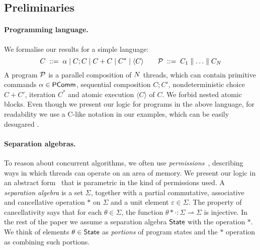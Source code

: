 %

\subsection{Preliminaries\label{sec:setting}}

\paragraph{Programming language.}
We formalise our results for a simple %
language:
$$
C  \;::=\;  \alpha
 \mid C;C
 \mid C+C 
 \mid C^* \mid \langle C \rangle
\qquad
\mathcal{P} \;::=\; C_1 \parallel \ldots \parallel C_N
$$ 
A program $\mathcal{P}$ is a parallel composition of $N$ threads, which can
contain primitive commands $\alpha \in {\sf PComm}$, %
sequential composition $C;C'$, nondeterministic choice $C+C'$, iteration
$C^*$ and atomic execution $\langle C \rangle$ of $C$.
We forbid nested atomic blocks. Even though we present our logic for programs in
the above language, for readability we use a C-like notation in our examples,
which can be easily desugared \tra{\ref{app:formal}}{\nformal}.

\paragraph{Separation algebras.} To reason about concurrent algorithms, we often use
{\em permissions}~\cite{boyland},
describing ways in which threads can operate on an area of memory.  We present
our logic in an abstract form~\cite{asl} that is parametric in the kind of
permissions used.
A {\em separation algebra} is a set $\Sigma$, together with a partial
commutative, associative and cancellative operation $*$ on $\Sigma$ and a unit element
$\varepsilon \in \Sigma$. 
The property of cancellativity says that for each $\theta \in \Sigma$, the
function $\theta * \cdot : \Sigma \rightharpoonup \Sigma$ is injective.
In the rest of the paper we assume a separation algebra ${\sf State}$ with
the operation $*$. We think of elements $\theta \in {\sf State}$ as {\em
  portions} of program states and the $*$ operation as combining such
portions.

